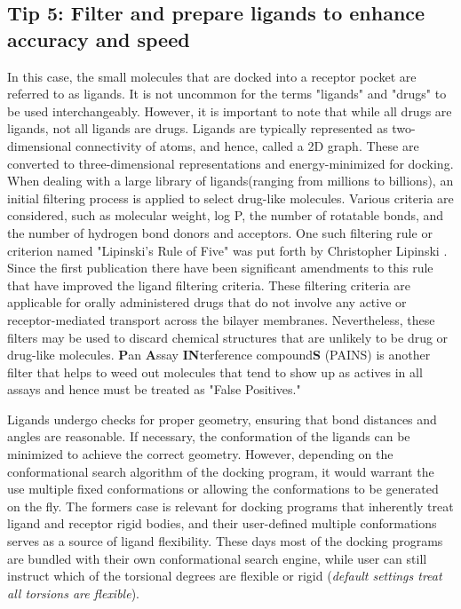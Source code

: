 \documentclass[10pt,letterpaper]{article}
\begin{document}
{{\subsection*{Tip 5: Filter and prepare ligands to enhance accuracy and speed}
In this case, the small molecules that are docked into a receptor pocket are referred to as ligands. It is not uncommon for the terms "ligands" and "drugs" to be used interchangeably. However, it is important to note that while all drugs are ligands, not all ligands are drugs. Ligands are typically represented as two-dimensional connectivity of atoms, and hence, called a 2D graph. These are converted to three-dimensional representations  and energy-minimized for docking.  When dealing with a large library of ligands\cite{bib10}(ranging from millions to billions), an initial filtering process is applied to select drug-like molecules. Various criteria are considered, such as molecular weight, log P, the number of rotatable bonds, and the number of hydrogen bond donors and acceptors. One such filtering  rule or criterion named "Lipinski's  Rule of Five" was put forth by Christopher Lipinski \cite{bib11}. Since the first publication there have been significant amendments to this rule that have improved the ligand filtering criteria\cite{bib12}. These filtering criteria are applicable for orally administered drugs that do not involve any active or receptor-mediated transport across the bilayer membranes. Nevertheless, these filters may be used to discard chemical structures that are unlikely to be drug or drug-like molecules. \textbf{P}an \textbf{A}ssay \textbf{IN}terference compound\textbf{S} (PAINS)\cite{bib63, bib64} is another filter that helps to weed out molecules that tend to show up as actives in all assays and hence must be treated as "False Positives."

Ligands undergo checks for proper geometry, ensuring that bond distances and angles are reasonable. If necessary, the conformation of the ligands can be minimized to achieve the correct geometry. However, depending on the conformational search algorithm of the docking program, it would warrant the use multiple fixed conformations or allowing the conformations to be generated on the fly. The formers case is relevant for docking programs that inherently treat ligand and receptor rigid bodies, and their user-defined multiple conformations serves as a source of ligand flexibility. These days most of the docking programs are bundled with their own conformational search engine, while user can still instruct which of the torsional degrees are flexible or rigid (\textit{default settings treat all torsions are flexible}).

}}
\end{document}
